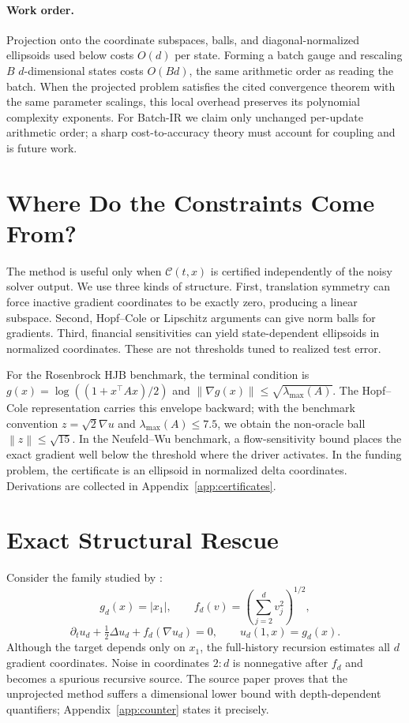 \documentclass{article}
\newcommand{\norm}[1]{\left\lVert #1\right\rVert}
\begin{document}
\paragraph{Work order.}
Projection onto the coordinate subspaces, balls, and diagonal-normalized ellipsoids used below costs $O(d)$ per state. Forming a batch gauge and rescaling $B$ $d$-dimensional states costs $O(Bd)$, the same arithmetic order as reading the batch. When the projected problem satisfies the cited convergence theorem with the same parameter scalings, this local overhead preserves its polynomial complexity exponents. For Batch-IR we claim only unchanged per-update arithmetic order; a sharp cost-to-accuracy theory must account for coupling and is future work.

\section{Where Do the Constraints Come From?}
\label{sec:certificates-main}
The method is useful only when $\mathcal C(t,x)$ is certified independently of the noisy solver output. We use three kinds of structure. First, translation symmetry can force inactive gradient coordinates to be exactly zero, producing a linear subspace. Second, Hopf--Cole or Lipschitz arguments can give norm balls for gradients. Third, financial sensitivities can yield state-dependent ellipsoids in normalized coordinates. These are not thresholds tuned to realized test error.

For the Rosenbrock HJB benchmark, the terminal condition is $g(x)=\log((1+x^\top Ax)/2)$ and $\norm{\nabla g(x)}\le\sqrt{\lambda_{\max}(A)}$. The Hopf--Cole representation carries this envelope backward; with the benchmark convention $z=\sqrt2\nabla u$ and $\lambda_{\max}(A)\le7.5$, we obtain the non-oracle ball $\norm z\le\sqrt{15}$. In the Neufeld--Wu benchmark, a flow-sensitivity bound places the exact gradient well below the threshold where the driver activates. In the funding problem, the certificate is an ellipsoid in normalized delta coordinates. Derivations are collected in Appendix~\ref{app:certificates}.

\section{Exact Structural Rescue}
\label{sec:rescue}
Consider the family studied by \citet{HutzenthalerNguyen2025}:
\begin{equation}
g_d(x)=|x_1|,\qquad
f_d(v)=\left(\sum_{j=2}^dv_j^2\right)^{1/2},
\label{eq:counterdata}
\end{equation}
\begin{equation}
\partial_tu_d+\tfrac12\Delta u_d+f_d(\nabla u_d)=0,
\qquad u_d(1,x)=g_d(x).
\label{eq:counterpde}
\end{equation}
Although the target depends only on $x_1$, the full-history recursion estimates all $d$ gradient coordinates. Noise in coordinates $2{:}d$ is nonnegative after $f_d$ and becomes a spurious recursive source. The source paper proves that the unprojected method suffers a dimensional lower bound with depth-dependent quantifiers; Appendix~\ref{app:counter} states it precisely.
\end{document}
